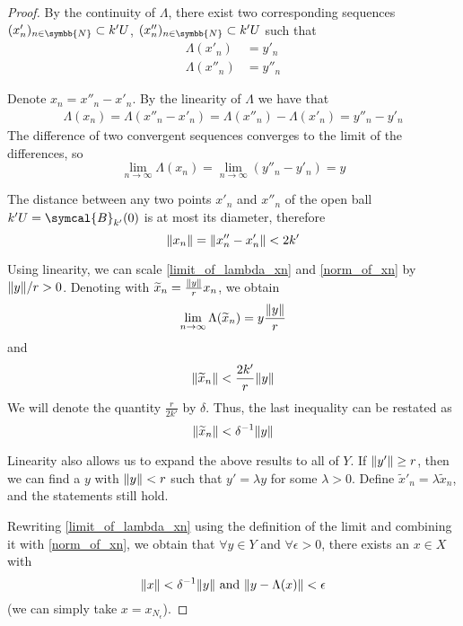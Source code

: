 \documentclass[a4paper, 12pt]{article}
\theoremstyle{definition}
\newcommand{\naturals}{\symbb{N}}
\newcommand{\ball}{\symcal{B}}
\DeclarePairedDelimiter{\norm}{\lVert}{\rVert}
\begin{document}
\begin{proof}
By the continuity of \(\Lambda\), there exist two corresponding sequences \((x'_n)_{n \in \naturals} \subset k'U\), \((x''_n)_{n \in \naturals} \subset k'U\) such that
\begin{align*}
    \Lambda(x'_n) &= y'_n \\
    \Lambda(x''_n) &= y''_n
\end{align*}

Denote \(x_n = x''_n - x'_n\). By the linearity of \(\Lambda\) we have that
\begin{gather*}
    \Lambda(x_n) = \Lambda(x''_n - x'_n) = \Lambda(x''_n) - \Lambda(x'_n) = y''_n - y'_n
\end{gather*}
The difference of two convergent sequences converges to the limit of the differences, so
\begin{equation} \label{limit_of_lambda_xn}
    \lim_{n \to \infty} \Lambda(x_n) = \lim_{n \to \infty} \left(y''_n - y'_n\right) = y
\end{equation}

The distance between any two points \(x'_n\) and \(x''_n\) of the open ball \(k'U = \ball_{k'} (0)\) is at most its diameter, therefore
\begin{equation} \label{norm_of_xn}
    \norm{x_n} = \norm{x''_n - x'_n} < 2k'
\end{equation}

Using linearity, we can scale \ref{limit_of_lambda_xn} and \ref{norm_of_xn} by \(\norm{y}/r > 0\). Denoting with \(\widetilde{x}_n = \frac{\norm{y}}{r} x_n\), we obtain
\[
    \lim_{n\to\infty} \Lambda(\widetilde{x}_n) = y \frac{\norm{y}}{r}
\]
and
\[
    \norm{\widetilde{x}_n} < \frac{2k'}{r} \norm{y}
\]
We will denote the quantity \(\frac{r}{2k'}\) by \(\delta\). Thus, the last inequality can be restated as
\[
    \norm{\widetilde{x}_n} < \delta^{-1} \norm{y}
\]

Linearity also allows us to expand the above results to all of \(Y\). If \(\norm{y'} \geq r\), then we can find a \(y\) with \(\norm{y} < r\) such that \(y' = \lambda y\) for some \(\lambda > 0\). Define \(\widetilde{x}'_n = \lambda \widetilde{x}_n\), and the statements still hold.

Rewriting \ref{limit_of_lambda_xn} using the definition of the limit and combining it with \ref{norm_of_xn}, we obtain that \(\forall y \in Y\) and \(\forall \epsilon > 0\), there exists an \(x \in X\) with
\begin{equation} \label{definition_of_x}
    \norm{x} < \delta^{-1} \norm{y} \text{ and } \norm{y - \Lambda(x)} < \epsilon
\end{equation}
(we can simply take \(x = x_{N_\epsilon}\)).


\end{proof}
\end{document}
